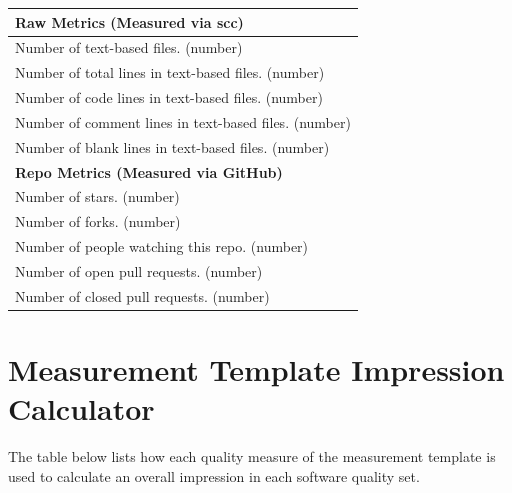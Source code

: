 \documentclass[letterpaper,cleveref]{lipics-v2019}
\begin{document}
\def\arraystretch{1.4}
\begin{tabular}{p{14cm}}
\hline		
\textbf{Raw Metrics (Measured via scc)}\\
\hline
Number of text-based files. (number)\\
Number of total lines in text-based files. (number)\\
Number of code lines in text-based files. (number)\\
Number of comment lines in text-based files. (number)\\
Number of blank lines in text-based files. (number)\\
\hline
\textbf{Repo Metrics (Measured via GitHub)}\\
\hline
Number of stars. (number)\\
Number of forks. (number)\\
Number of people watching this repo. (number)\\
Number of open pull requests. (number)\\
Number of closed pull requests. (number)\\
\hline
\end{tabular}

\newpage

\section{Measurement Template Impression Calculator} \label{SecImpressionCalculator}

The table below lists how each quality measure of the measurement template is
used to calculate an overall impression in each software quality set.

\newpage
\end{document}
